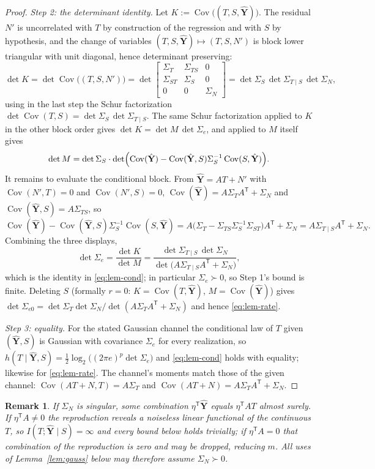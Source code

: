 \documentclass[11pt,onecolumn]{IEEEtran}
\newtheorem{remark}[theorem]{Remark}
\newcommand{\Cov}{\operatorname{Cov}}
\begin{document}
\begin{proof}
\emph{Step 2: the determinant identity.} Let
$K:=\Cov\bigl((T,S,\hat{\mathbf Y})\bigr)$. The residual $N'$ is
uncorrelated with $T$ by construction of the regression and with $S$ by
hypothesis, and the change of variables
$(T,S,\hat{\mathbf Y})\mapsto(T,S,N')$ is block lower triangular with
unit diagonal, hence determinant preserving:
\[
\det K=\det\Cov\bigl((T,S,N')\bigr)
=\det\begin{bmatrix}
\Sigma_T&\Sigma_{TS}&0\\
\Sigma_{ST}&\Sigma_S&0\\
0&0&\Sigma_N
\end{bmatrix}
=\det\Sigma_S\,\det\Sigma_{T\mid S}\,\det\Sigma_N,
\]
using in the last step the Schur factorization
$\det\Cov(T,S)=\det\Sigma_S\,\det\Sigma_{T\mid S}$. The same Schur
factorization applied to $K$ in the other block order gives
$\det K=\det M\,\det\Sigma_e$, and applied to $M$ itself gives
\[
\det M=\det\Sigma_S\cdot\det\Bigl(\Cov(\hat{\mathbf Y})
-\Cov(\hat{\mathbf Y},S)\Sigma_S^{-1}\Cov(S,\hat{\mathbf Y})\Bigr).
\]
It remains to evaluate the conditional block. From
$\hat{\mathbf Y}=AT+N'$ with $\Cov(N',T)=0$ and $\Cov(N',S)=0$,
$\Cov(\hat{\mathbf Y})=A\Sigma_TA^{\mathsf T}+\Sigma_N$ and
$\Cov(\hat{\mathbf Y},S)=A\Sigma_{TS}$, so
\[
\Cov(\hat{\mathbf Y})-\Cov(\hat{\mathbf Y},S)\Sigma_S^{-1}
\Cov(S,\hat{\mathbf Y})
=A\bigl(\Sigma_T-\Sigma_{TS}\Sigma_S^{-1}\Sigma_{ST}\bigr)A^{\mathsf T}
+\Sigma_N
=A\Sigma_{T\mid S}A^{\mathsf T}+\Sigma_N .
\]
Combining the three displays,
\[
\det\Sigma_e=\frac{\det K}{\det M}
=\frac{\det\Sigma_{T\mid S}\,\det\Sigma_N}
{\det\bigl(A\Sigma_{T\mid S}A^{\mathsf T}+\Sigma_N\bigr)},
\]
which is the identity in \eqref{eq:lem-cond}; in particular
$\Sigma_e\succ0$, so Step 1's bound is finite. Deleting $S$ (formally
$r=0$: $K=\Cov(T,\hat{\mathbf Y})$, $M=\Cov(\hat{\mathbf Y})$) gives
$\det\Sigma_{e0}=\det\Sigma_T\det\Sigma_N/
\det(A\Sigma_TA^{\mathsf T}+\Sigma_N)$ and hence \eqref{eq:lem-rate}.

\emph{Step 3: equality.} For the stated Gaussian channel the conditional
law of $T$ given $(\hat{\mathbf Y},S)$ is Gaussian with covariance
$\Sigma_e$ for every realization, so
$h(T\mid\hat{\mathbf Y},S)=\tfrac12\log_2\bigl((2\pi e)^p
\det\Sigma_e\bigr)$ and \eqref{eq:lem-cond} holds with equality;
likewise for \eqref{eq:lem-rate}. The channel's moments match those of
the given channel: $\Cov(AT+N,T)=A\Sigma_T$ and
$\Cov(AT+N)=A\Sigma_TA^{\mathsf T}+\Sigma_N$.
\end{proof}

\begin{remark}\label{rem:degenerate}
If $\Sigma_N$ is singular, some combination
$\eta^{\mathsf T}\hat{\mathbf Y}$ equals $\eta^{\mathsf T}AT$ almost
surely. If $\eta^{\mathsf T}A\ne0$ the reproduction reveals a noiseless linear
functional of the continuous $T$, so
$I(T;\hat{\mathbf Y}\mid S)=\infty$ and every bound below holds
trivially; if $\eta^{\mathsf T}A=0$ that combination of the reproduction is
zero and may be dropped, reducing $m$. All uses of
Lemma~\ref{lem:gauss} below may therefore assume $\Sigma_N\succ0$.
\end{remark}
\end{document}
